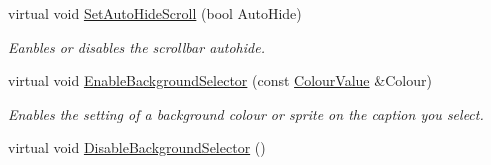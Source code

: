 \begin{DoxyCompactItemize}
virtual void \hyperlink{classphys_1_1UI_1_1ListBox_a60fc5c1907df6d83217b25c2c8f15f48}{SetAutoHideScroll} (bool AutoHide)
\begin{DoxyCompactList}\small\item\em Eanbles or disables the scrollbar autohide. \item\end{DoxyCompactList}\item 
virtual void \hyperlink{classphys_1_1UI_1_1ListBox_a2f3612cc6062a279f0b6f69a1b2fc4eb}{EnableBackgroundSelector} (const \hyperlink{classphys_1_1ColourValue}{ColourValue} \&Colour)
\begin{DoxyCompactList}\small\item\em Enables the setting of a background colour or sprite on the caption you select. \item\end{DoxyCompactList}\item 
\hypertarget{classphys_1_1UI_1_1ListBox_a05191b1f2515dead89abbcd6bd63b4d0}{
virtual void \hyperlink{classphys_1_1UI_1_1ListBox_a05191b1f2515dead89abbcd6bd63b4d0}{DisableBackgroundSelector} ()}
\label{d0/d28/classphys_1_1UI_1_1ListBox_a05191b1f2515dead89abbcd6bd63b4d0}


\end{DoxyCompactItemize}
